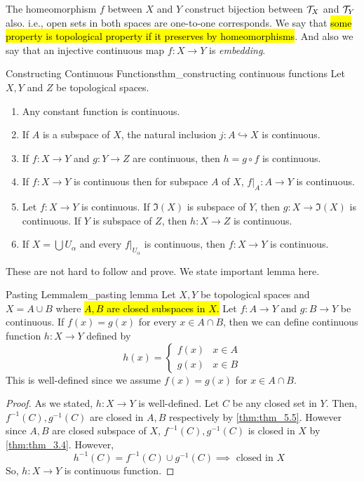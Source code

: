 \documentclass[12pt, a4paper, twoside]{article}
\theoremstyle{plain}
\begin{document}
The homeomorphism $f$ between $X$ and $Y$ construct bijection between ${\mathcal {T}}_X$ and ${\mathcal {T}}_Y$ also. i.e., open sets in both spaces are one-to-one corresponds. 
We say that \hl{some property is topological property if it preserves by homeomorphisms}. 
And also we say that an injective continuous map $f: X \rightarrow Y$ is \textit{embedding}. 

\begin{thm}{Constructing Continuous Functions}{thm_constructing continuous functions}
Let $X, Y$ and $Z$ be topological spaces. 
\begin{enumerate}
    \item Any constant function is continuous. 
    \item If $A$ is a subspace of $X$, the natural inclusion $j: A \hookrightarrow X$ is continuous. 
    \item If $f: X \rightarrow Y$ and $g: Y \rightarrow Z$ are continuous, then $h = g \circ f$ is continuous. 
    \item If $f: X \rightarrow Y$ is continuous then for subspace $A$ of $X$, $f|_A : A \rightarrow Y$ is continuous. 
    \item Let $f: X \rightarrow Y$ is continuous. If $\Im(X)$ is subspace of $Y$, then $g: X \rightarrow \Im(X)$ is continuous. If $Y$ is subspace of $Z$, then $h: X \rightarrow Z$ is continuous. 
    \item If $X = \bigcup U_\alpha$ and every $f|_{U_\alpha}$ is continuous, then $f: X \rightarrow Y$ is continuous.
\end{enumerate}
\end{thm}

These are not hard to follow and prove. We state important lemma here. 

\begin{lem}{Pasting Lemma}{lem_pasting lemma}
    Let $X, Y$ be topological spaces and $X = A \cup B$ where \hl{$A, B$ are closed subspaces in $X$.} 
    Let $f: A \rightarrow Y$ and $g: B \rightarrow Y$ be continuous. If $f(x) = g(x)$ for every $x \in A \cap B$, 
    then we can define continuous function $h: X \rightarrow Y$ defined by 
    \[h(x) = \begin{cases}
        f(x) & x \in A \\
        g(x) & x \in B   
    \end{cases}\]
    This is well-defined since we assume $f(x) = g(x)$ for $x \in A \cap B$. 
\end{lem}

\begin{proof}
    As we stated, $h: X \rightarrow Y$ is well-defined. Let $C$ be any closed set in $Y$. Then, $f^{-1}(C), g^{-1}(C)$ are closed in $A, B$ respectively by \ref{thm:thm_5.5}. 
    However since $A, B$ are closed subspace of $X$, $f^{-1}(C), g^{-1}(C)$ is closed in $X$ by \ref{thm:thm_3.4}. 
    However, 
    \[h^{-1}(C) = f^{-1}(C) \cup g^{-1}(C) \implies \text{ closed in $X$ }\]
    So, $h: X \rightarrow Y$ is continuous function. 
\end{proof}
\end{document}
